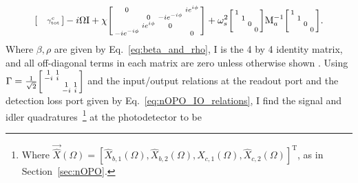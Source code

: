 \begin{align}
\begin{bsmallmatrix}
 &  &  & \gamma^c_\mathrm{tot} 
\end{bsmallmatrix}-i\Omega \text{I}+\chi \begin{bsmallmatrix}
0 &  &  & i e^{i\phi} \\
 & 0 & -i e^{-i\phi} &  \\
 & i e^{i\phi} & 0 &  \\
-i e^{-i\phi} &  &  & 0
\end{bsmallmatrix}+\omega_s^2\begin{bsmallmatrix}
1 &  &  &  \\
 & 1 &  &  \\
 &  & 0 &  \\
 &  &  & 0
\end{bsmallmatrix}\text{M}_a^{-1}\begin{bsmallmatrix}
1 &  &  &  \\
 & 1 &  &  \\
 &  & 0 &  \\
 &  &  & 0
\end{bsmallmatrix}.
\end{align}
Where $\beta, \rho$ are given by Eq.~\ref{eq:beta_and_rho}, $\text{I}$ is the 4 by 4 identity matrix, and all off-diagonal terms in each matrix are zero unless otherwise shown . Using $\Gamma= \frac{1}{\sqrt2}\begin{bsmallmatrix}
1 & 1 &  &  \\
-i & i &  &  \\
 &  & 1 & 1 \\
 &  & -i & i
\end{bsmallmatrix}$ and the input/output relations at the readout port and the detection loss port given by Eq.~\ref{eq:nOPO_IO_relations}, I find the signal and idler quadratures~\footnote{Where $\vec{\hat X}(\Omega)=[\hat X_{b,1}(\Omega),\hat X_{b,2}(\Omega),\hat X_{c,1}(\Omega),\hat X_{c,2}(\Omega)]^\text{T}$, as in Section~\ref{sec:nOPO}.} at the photodetector to be
\begingroup
\allowdisplaybreaks
